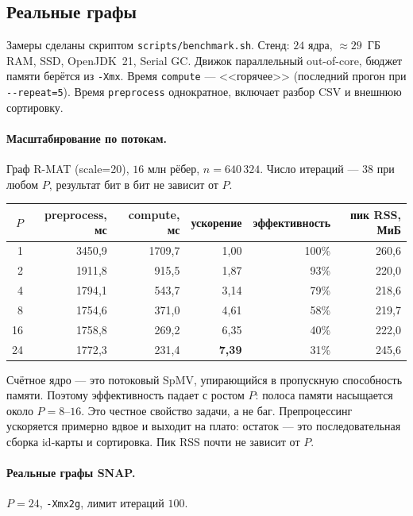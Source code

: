 \subsection{Реальные графы}
Замеры сделаны скриптом \texttt{scripts/benchmark.sh}. Стенд: $24$ ядра, $\approx 29$~ГБ RAM, SSD,
OpenJDK~21, Serial GC. Движок параллельный out-of-core, бюджет памяти берётся из \texttt{-Xmx}. Время
\texttt{compute} --- <<горячее>> (последний прогон при \texttt{-{}-repeat=5}). Время
\texttt{preprocess} однократное, включает разбор CSV и внешнюю сортировку.

\paragraph{Масштабирование по потокам.} Граф R-MAT (scale=20), $16$ млн рёбер, $n = 640\,324$. Число
итераций --- $38$ при любом $P$, результат бит в бит не зависит от $P$.

\begin{center}
\small
\begin{tabular}{rrrrrr}
\toprule
$P$ & preprocess, мс & compute, мс & ускорение & эффективность & пик RSS, МиБ\\
\midrule
1  & 3450{,}9 & 1709{,}7 & 1{,}00 & 100\% & 260{,}6\\
2  & 1911{,}8 & 915{,}5  & 1{,}87 & 93\%  & 220{,}0\\
4  & 1794{,}1 & 543{,}7  & 3{,}14 & 79\%  & 218{,}6\\
8  & 1754{,}6 & 371{,}0  & 4{,}61 & 58\%  & 219{,}7\\
16 & 1758{,}8 & 269{,}2  & 6{,}35 & 40\%  & 222{,}0\\
24 & 1772{,}3 & 231{,}4  & \textbf{7{,}39} & 31\% & 245{,}6\\
\bottomrule
\end{tabular}
\end{center}

Счётное ядро --- это потоковый SpMV, упирающийся в пропускную способность памяти. Поэтому
эффективность падает с ростом $P$: полоса памяти насыщается около $P=8$--$16$. Это честное свойство
задачи, а не баг. Препроцессинг ускоряется примерно вдвое и выходит на плато: остаток --- это
последовательная сборка id-карты и сортировка. Пик RSS почти не зависит от $P$.

\paragraph{Реальные графы SNAP.} $P=24$, \texttt{-Xmx2g}, лимит итераций $100$.


